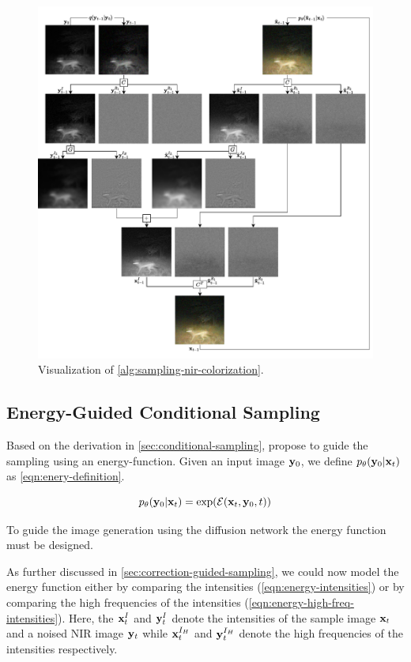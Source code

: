 \begin{figure}
   \includegraphics[width=\textwidth]{gfx/NIR-Colorization-Sampling.pdf}
   \caption{Visualization of \autoref{alg:sampling-nir-colorization}.}
   \label{fig:sampling-nir-colorization}
\end{figure}


\subsection{Energy-Guided Conditional Sampling}
\label{sec:energy-guided-sampling}
Based on the derivation in \autoref{sec:conditional-sampling}, \textcite{egsde} propose to guide the sampling using an energy-function.
Given an input image $\mathbf{y}_0$, we define $p_\theta(\mathbf{y}_0|\mathbf{x}_t)$ as \autoref{eqn:enery-definition}.

\begin{equation}
   \label{eqn:enery-definition}
   p_\theta(\mathbf{y}_0|\mathbf{x}_t) = \exp(\mathcal{E}(\mathbf{x}_t, \mathbf{y}_0, t))
\end{equation}

To guide the image generation using the diffusion network the energy function must be designed.

As further discussed in \autoref{sec:correction-guided-sampling},
we could now model the energy function either by comparing the intensities (\autoref{eqn:energy-intensities}) or by comparing the high frequencies of the intensities (\autoref{eqn:energy-high-freq-intensities}).
Here, the $\mathbf{x}^I_t$ and $\mathbf{y}^I_t$ denote the intensities of the sample image $\mathbf{x}_t$ and a noised NIR image $\mathbf{y}_t$ while $\mathbf{x}^{I_H}_t$ and $\mathbf{y}^{I_H}_t$  denote the high frequencies of the intensities respectively.


